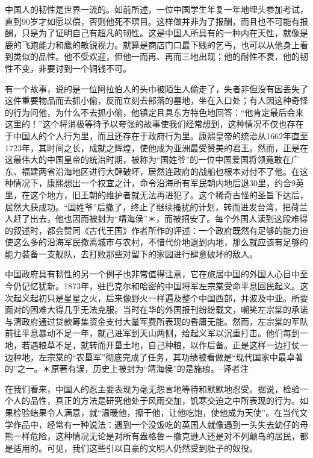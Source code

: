 \documentclass[12pt,oneside]{book}
\begin{document}
\begin{common-format}
中国人的韧性是世界一流的。如前所述，一位中国学生年复一年地埋头参加考试，直到90岁才如愿以偿，否则他死不瞑目。这样做并非为了报酬，而且也不可能有报酬，只是为了证明自己有超凡的韧性。这是中国人所具有的一种内在天性，就像是鹿的飞跑能力和鹰的敏锐视力。就算是商店门口最下贱的乞丐，也可以从他身上看到类似的品性。他不受欢迎，但他一而再、再而三地出现；他的耐性不衰，他的韧性不变，非要讨到一个铜钱不可。 

有一个故事，说的是一位阿拉伯人的头巾被陌生人偷走了，失者非但没有因丢失了这件重要物品而去抓小偷，反而立刻去部落的墓地，坐在入口处；有人因这种奇怪的行为问他，为什么不去抓小偷，他镇定且具东方特色地回答：“他肯定最后会来这里的！”这个将消极等待予以夸张的故事使我们经常想到，这种情况不仅也存在于中国人的个人行为里，而且还存在于政府行为里。康熙皇帝的统治从1662年直至1723年，其时间之长，成就之辉煌，使他成为亚洲最受赞美的君王。然而，正是在这最伟大的中国皇帝的统治时期，被称为“国姓爷”的一位中国爱国将领竟敢在广东、福建两省沿海地区进行大肆破坏，居然连政府的战船也根本对付不了他。在这种情况下，康熙想出一个权宜之计，命令沿海所有军民朝内地后退30里，约合9英里，在这个地方，旧王朝的维护者就无法再进犯了。这个稀奇古怪的圣旨下达后，居然大获成功。“国姓爷”后撤了，终止了继续搔扰的计划，转而进发台湾，把荷兰人赶了出去，他也因而被封为“靖海侯”＊，而被招安了。每个外国人读到这段难得的叙述时，都会赞同《古代王国》作者所作的评述：一个政府既然有足够的能力迫使这么多的沿海军民撤离城市与农村，不惜代价地退到内地，那么就应该有足够的能力装备一支舰队，去打败那些对留下的家园进行肆意破坏的敌人。 

中国政府具有韧性的另一个例子也非常值得注意，它在旅居中国的外国人心目中至今仍记忆犹新。1873年，驻巴克尔和哈密的中国将军左宗棠受命平息回民起义。这次起义起初只是星星之火，后来像野火一样遍及整个中国西部，并波及中亚。所要面对的困难大得几乎无法克服。当时在华的外国报刊纷纷载文，嘲笑左宗棠的承诺与清政府通过贷款筹集资金支付大量军费所表现的昏庸无能。然而，左宗棠的军队前往平息暴动不足一年，就己进军到天山两侧，给起义军以沉重打击。他们每到一地，若遇粮草不足，就转而开垦土地，自己种粮，以作后备。正是这样一边打仗一边种地，左宗棠的“农垦军”彻底完成了任务，其功绩被看做是“现代国家中最卓著的”之一。＊原著有误，历史上被封为“靖海侯”的是施琅。--译者注 

在我们看来，中国人的忍主要表现为毫无怨言地等待和默默地忍受。据说，检验一个人的品性，真正的方法是研究他处于风雨交加，饥寒交迫之中所表现的行为。如果检验结果令人满意，就“温暖他，擦干他，让他吃饱，使他成为天使”。在当代文学作品中，经常有一种说法：遇到一个没饭吃的英国人就像遇到一头失去幼仔的母熊一样危险，这种情况无论是对所有盎格鲁－撤克逊人还是对不列颠岛的居民，都是适用的。可见，我们这些引以自豪的文明人仍然受到肚子的奴役。 


\end{common-format}
\end{document}
